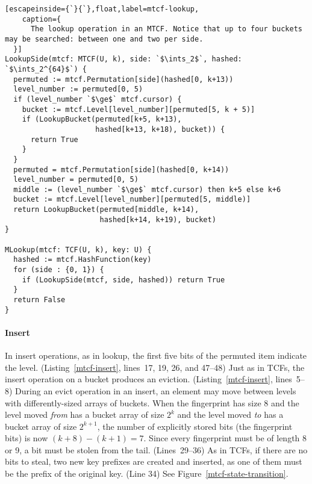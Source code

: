 \documentclass[sigconf]{acmart}
\newcommand{\ints}{\mathbb{Z}}
\begin{document}
\begin{lstlisting}[escapeinside={`}{`},float,label=mtcf-lookup,
    caption={
      The lookup operation in an MTCF. Notice that up to four buckets may be searched: between one and two per side.
  }]
LookupSide(mtcf: MTCF(U, k), side: `$\ints_2$`, hashed: `$\ints_2^{64}$`) {
  permuted := mtcf.Permutation[side](hashed[0, k+13))
  level_number := permuted[0, 5)
  if (level_number `$\ge$` mtcf.cursor) {
    bucket := mtcf.Level[level_number][permuted[5, k + 5)]
    if (LookupBucket(permuted[k+5, k+13),
                     hashed[k+13, k+18), bucket)) {
      return True
    }
  }
  permuted = mtcf.Permutation[side](hashed[0, k+14))
  level_number = permuted[0, 5)
  middle := (level_number `$\ge$` mtcf.cursor) then k+5 else k+6
  bucket := mtcf.Level[level_number][permuted[5, middle)]
  return LookupBucket(permuted[middle, k+14),
                      hashed[k+14, k+19), bucket)
}

MLookup(mtcf: TCF(U, k), key: U) {
  hashed := mtcf.HashFunction(key)
  for (side : {0, 1}) {
    if (LookupSide(mtcf, side, hashed)) return True
  }
  return False
}
\end{lstlisting}


\paragraph{Insert}
In insert operations, as in lookup, the first five bits of the permuted item indicate the level. (Listing~\ref{mtcf-insert}, lines~17, 19, 26, and 47--48)
Just as in TCFs, the insert operation on a bucket produces an eviction. (Listing~\ref{mtcf-insert}, lines~5--8)
During an evict operation in an insert, an element may move between levels with differently-sized arrays of buckets.
When the fingerprint has size 8 and the level moved {\em from} has a bucket array of size $2^k$ and the level moved {\em to} has a bucket array of size $2^{k+1}$, the number of explicitly stored bits (the fingerprint bits) is now $(k + 8) - (k+1) = 7$.
Since every fingerprint must be of length 8 or 9, a bit must be stolen from the tail. (Lines~29--36)
As in TCFs, if there are no bits to steal, two new key prefixes are created and inserted, as one of them must be the prefix of the original key. (Line 34)
See Figure~\ref{mtcf-state-transition}.
\end{document}
